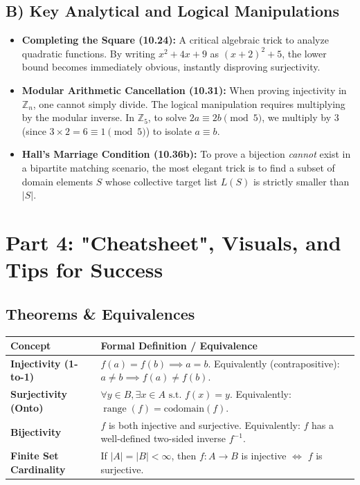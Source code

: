 \documentclass[11pt, a4paper]{article}
\theoremstyle{definition}
\theoremstyle{remark}
\newcommand{\Z}{\mathbb{Z}}
\newcommand{\range}{\operatorname{range}}
\begin{document}
\subsection{B) Key Analytical and Logical Manipulations}
\begin{itemize}
    \item \textbf{Completing the Square (10.24):} A critical algebraic trick to analyze quadratic functions. By writing $x^2 + 4x + 9$ as $(x+2)^2 + 5$, the lower bound becomes immediately obvious, instantly disproving surjectivity.
    \item \textbf{Modular Arithmetic Cancellation (10.31):} When proving injectivity in $\Z_n$, one cannot simply divide. The logical manipulation requires multiplying by the modular inverse. In $\Z_5$, to solve $2a \equiv 2b \pmod 5$, we multiply by $3$ (since $3 \times 2 = 6 \equiv 1 \pmod 5$) to isolate $a \equiv b$.
    \item \textbf{Hall's Marriage Condition (10.36b):} To prove a bijection \textit{cannot} exist in a bipartite matching scenario, the most elegant trick is to find a subset of domain elements $S$ whose collective target list $L(S)$ is strictly smaller than $|S|$.
\end{itemize}

\newpage
\section{Part 4: "Cheatsheet", Visuals, and Tips for Success}

\subsection{Theorems \& Equivalences}
\renewcommand{\arraystretch}{1.5}
\begin{table}[h!]
\centering
\begin{tabularx}{\textwidth}{>{\raggedright\arraybackslash}p{4cm} X}
\toprule
\textbf{Concept} & \textbf{Formal Definition / Equivalence} \\
\midrule
\textbf{Injectivity (1-to-1)} & $f(a) = f(b) \implies a = b$. Equivalently (contrapositive): $a \neq b \implies f(a) \neq f(b)$. \\
\textbf{Surjectivity (Onto)} & $\forall y \in B, \exists x \in A \text{ s.t. } f(x) = y$. Equivalently: $\range(f) = \text{codomain}(f)$. \\
\textbf{Bijectivity} & $f$ is both injective and surjective. Equivalently: $f$ has a well-defined two-sided inverse $f^{-1}$. \\
\textbf{Finite Set Cardinality} & If $|A| = |B| < \infty$, then $f: A \to B$ is injective $\iff$ $f$ is surjective. \\
\bottomrule
\end{tabularx}
\end{table}
\end{document}
